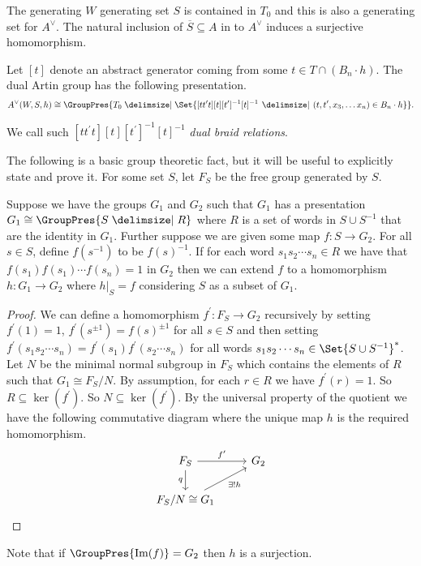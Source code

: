 \begin{theorem}
	The generating $W$ generating set $S$ is contained in $T_0$ and this is also a generating set for $A^\vee$.
	The natural inclusion of $\overline{S} \subseteq A$ in to $A^\vee$ induces a surjective homomorphism.
	\label{thm:homo_art_to_dual_art}
\end{theorem}

\begin{theorem}
	Let $[t]$ denote an abstract generator coming from some $t \in T \cap(B_n \cdot h)$.
The dual Artin group has the following presentation.
	\[
		A^\vee(W,S,h) \cong \GroupPres{T_0 \relations \Set{ [t t^\prime t][t][t^\prime]^{-1}[t]^{-1} \given (t,t^\prime,x_3, \ldots x_n) \in B_n \cdot h}}
		.\]
	\label{thm:dual_braid_relations}
\end{theorem}

We call such $[t t^\prime t][t][t^\prime]^{-1}[t]^{-1}$ \emph{dual braid relations}.

The following is a basic group theoretic fact, but it will be useful to explicitly state and prove it.
For some set $S$, let $F_S$ be the free group generated by $S$.
\begin{lemma}
	Suppose we have the groups $G_1$ and $G_2$ such that $G_1$ has a presentation $G_1 \cong \GroupPres{S \relations R}$ where $R$ is a set of words in $S \cup S^{-1}$ that are the identity in $G_1$.
Further suppose we are given some map $f \colon S \to G_2$.
For all $s \in S$, define $f(s^{-1})$ to be $f(s)^{-1}$.
If for each word $s_1s_2 \cdots s_n \in R$ we have that $f(s_1)f(s_1)\cdots f(s_n) = 1$ in $G_2$ then we can extend $f$ to a homomorphism  $h \colon G_1 \to G_2$ where $h|_{S} = f$ considering $S$ as a subset of $G_1$.
\label{lem:extend_map_to_homomorphism}
\end{lemma}
\begin{proof}
	We can define a homomorphism $f^\prime \colon F_{S} \to G_2$ recursively by setting $f^\prime(1) =1$, $f^\prime(s^{\pm 1}) = f(s)^{\pm 1}$ for all $s \in S$ and then setting $f^\prime(s_1s_2 \cdots s_n) = f^\prime(s_1)f^\prime(s_2\cdots s_n)$ for all words $s_1s_2\cdots s_n \in \Set{S \cup S^{-1}}^*$.
Let $N$ be the minimal normal subgroup in $F_{S}$ which contains the elements of $R$ such that $G_1 \cong F_{S}/N$.
By assumption, for each $r \in R$ we have $f^\prime(r) = 1$.
So $R \subseteq \ker(f^\prime)$.
So $N \subseteq \ker(f^\prime)$.
By the universal property of the quotient we have the following commutative diagram where the unique map $h$ is the required homomorphism.
	\begin{equation*}
		\begin{tikzcd}
			F_{S} \ar[r, "f^\prime"] \ar[d, "q"'] &G_2 \\
			F_{S}/N \cong G_1 \ar[ru, "\exists ! h"']
		\end{tikzcd}
	\end{equation*}
\end{proof}
Note that if $\GroupPres{\image(f)} = G_2$ then $h$ is a surjection.


